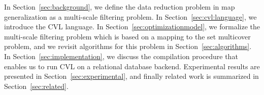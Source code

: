 In Section~\ref{sec:background}, we define the data reduction problem in map generalization as a multi-scale filtering problem. In Section~\ref{sec:cvl:language}, we introduce the CVL language. In Section~\ref{sec:optimizationmodel}, we formalize the multi-scale filtering problem which is based on a mapping to the set multicover problem, and we revisit algorithms for this problem in Section~\ref{sec:algorithms}. In Section~\ref{sec:implementation}, we discuss the compilation procedure that enables us to run CVL on a relational database backend. Experimental results are presented in Section~\ref{sec:experimental}, and finally related work is summarized in Section~\ref{sec:related}.
